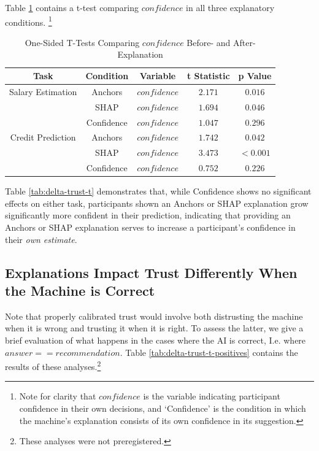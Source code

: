 Table \ref{tab:delta-confidence-t} contains a t-test comparing $confidence$ in all three explanatory conditions. \footnote{Note for clarity that $confidence$ is the variable indicating participant confidence in their own decisions, and `Confidence' is the condition in which the machine's explanation consists of its own confidence in its suggestion.}

\begin{table}[htbp]
    \caption{One-Sided T-Tests Comparing $confidence$ Before- and After-Explanation}
    \begin{center}
    \begin{tabular}{ccccc}
        \toprule
        Task & Condition & Variable & t Statistic & p Value \\
        \midrule
        Salary Estimation & Anchors & $confidence$ & $\mathbf{2.171}$ & $\mathbf{0.016}$ \\
        & SHAP & $confidence$ & $\mathbf{1.694}$ & $\mathbf{0.046}$ \\
        & Confidence & $confidence$ & $1.047$ & $0.296$ \\
        \midrule
        Credit Prediction & Anchors & $confidence$ & $\mathbf{1.742}$ & $\mathbf{0.042}$ \\
        & SHAP & $confidence$ & $\mathbf{3.473}$ & $\mathbf{<0.001}$ \\
        & Confidence & $confidence$ & $0.752$ & $0.226$ \\
        \bottomrule
    \end{tabular}
    \label{tab:delta-confidence-t}
    \end{center}
\end{table}

Table \ref{tab:delta-trust-t} demonstrates that, while Confidence shows no significant effects on either task, participants shown an Anchors or SHAP explanation grow significantly more confident in their prediction, indicating that providing an Anchors or SHAP explanation serves to increase a participant's confidence in their \emph{own estimate}.

\subsection{Explanations Impact Trust Differently When the Machine is Correct}
Note that properly calibrated trust would involve both distrusting the machine when it is wrong and trusting it when it is right. To assess the latter, we give a brief evaluation of what happens in the cases where the AI is correct, I.e. where $answer == recommendation$. Table \ref{tab:delta-trust-t-positives} contains the results of these analyses.\footnote{These analyses were not preregistered.}

